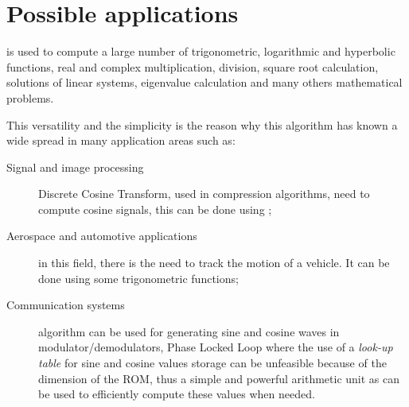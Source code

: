 \section{Possible applications}\label{sec:applications}

\cordic{} is used to compute a large number of trigonometric, logarithmic and
hyperbolic functions, real and complex multiplication, division, square root
calculation, solutions of linear systems, eigenvalue calculation and many others
mathematical problems.

This versatility and the simplicity is the reason why this algorithm has known a
wide spread in many application areas such as:
\begin{description}
	\item [Signal and image processing] Discrete Cosine Transform, used in
		compression algorithms, need to compute cosine signals, this can
		be done using \cordic{};
	\item[Aerospace and automotive applications] in this field, there is the
		need to track the motion of a vehicle. It can be done using some
		trigonometric functions;
	\item[Communication systems] \cordic{} algorithm can be used for
		generating sine and cosine waves in modulator/demodulators,
		Phase Locked Loop where the use of a \emph{look-up table} for
		sine and cosine values storage can be unfeasible because of the
		dimension of the ROM, thus a simple and powerful arithmetic unit
		as \cordic{} can be used to efficiently compute these values
		when needed.
\end{description}
